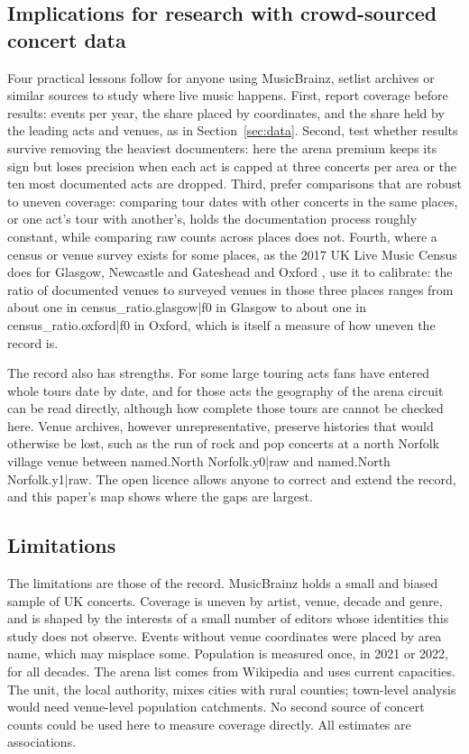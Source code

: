 \documentclass[11pt,a4paper]{article}
\begin{document}
\subsection{Implications for research with crowd-sourced concert data}
Four practical lessons follow for anyone using MusicBrainz, setlist archives or similar sources to study where live music happens. First, report coverage before results: events per year, the share placed by coordinates, and the share held by the leading acts and venues, as in Section~\ref{sec:data}. Second, test whether results survive removing the heaviest documenters: here the arena premium keeps its sign but loses precision when each act is capped at three concerts per area or the ten most documented acts are dropped. Third, prefer comparisons that are robust to uneven coverage: comparing tour dates with other concerts in the same places, or one act's tour with another's, holds the documentation process roughly constant, while comparing raw counts across places does not. Fourth, where a census or venue survey exists for some places, as the 2017 UK Live Music Census does for Glasgow, Newcastle and Gateshead and Oxford \citep{webster2018}, use it to calibrate: the ratio of documented venues to surveyed venues in those three places ranges from about one in {{census_ratio.glasgow|f0}} in Glasgow to about one in {{census_ratio.oxford|f0}} in Oxford, which is itself a measure of how uneven the record is.

The record also has strengths. For some large touring acts fans have entered whole tours date by date, and for those acts the geography of the arena circuit can be read directly, although how complete those tours are cannot be checked here. Venue archives, however unrepresentative, preserve histories that would otherwise be lost, such as the run of rock and pop concerts at a north Norfolk village venue between {{named.North Norfolk.y0|raw}} and {{named.North Norfolk.y1|raw}}. The open licence allows anyone to correct and extend the record, and this paper's map shows where the gaps are largest.

\subsection{Limitations}
The limitations are those of the record. MusicBrainz holds a small and biased sample of UK concerts. Coverage is uneven by artist, venue, decade and genre, and is shaped by the interests of a small number of editors whose identities this study does not observe. Events without venue coordinates were placed by area name, which may misplace some. Population is measured once, in 2021 or 2022, for all decades. The arena list comes from Wikipedia and uses current capacities. The unit, the local authority, mixes cities with rural counties; town-level analysis would need venue-level population catchments. No second source of concert counts could be used here to measure coverage directly. All estimates are associations.
\end{document}
